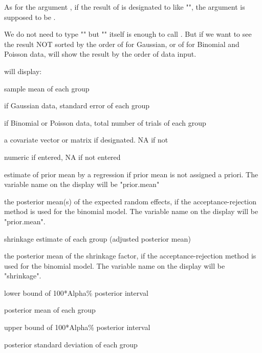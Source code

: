 \documentclass[a4paper]{book}
\begin{document}
%
\begin{Details}\relax
As for the argument , if the result of  is designated to 
 like "", the argument  is supposed to be .

We do not need to type "" but "" itself is enough to call . But if we want to see the result NOT sorted by the order of  for Gaussian, or of  for Binomial and Poisson data,  will show the result by the order of data input.
\end{Details}
%
\begin{Value}
 will display:
\begin{ldescription}
\item[\code{obs.mean}] sample mean of each group
\item[\code{se}] if Gaussian data, standard error of each group
\item[\code{n}] if Binomial or Poisson data, total number of trials of each group
\item[\code{X}] a covariate vector or matrix if designated. NA if not
\item[\code{prior.mean}] numeric if entered, NA if not entered
\item[\code{prior.mean.hat}] estimate of prior mean by a regression if prior mean is not assigned a priori. The variable name on the display will be "prior.mean"
\item[\code{prior.mean.AR}] the posterior mean(s) of the expected random effects, if the acceptance-rejection method is used for the binomial model. The variable name on the display will be "prior.mean".
\item[\code{shrinkage}] shrinkage estimate of each group (adjusted posterior mean)
\item[\code{shrinkage.AR}] the posterior mean of the shrinkage factor, if the acceptance-rejection method is used for the binomial model. The variable name on the display will be "shrinkage".
\item[\code{low.intv}] lower bound of 100*Alpha\% posterior interval
\item[\code{post.mean}] posterior mean of each group
\item[\code{upp.intv}] upper bound of 100*Alpha\% posterior interval
\item[\code{post.sd}] posterior standard deviation of each group
\end{ldescription}
\end{Value}
\end{document}
